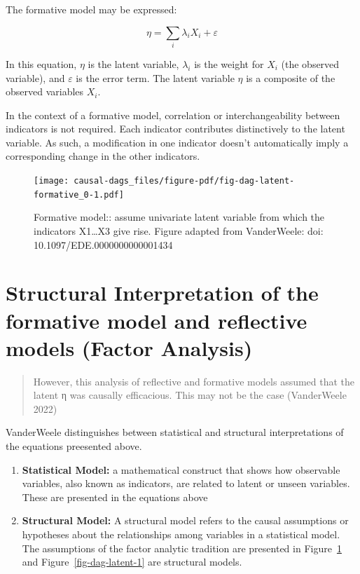 \documentclass[
  singlecolumn]{report}
\begin{document}
The formative model may be expressed:

\[\eta = \sum_i\lambda_i X_i + \varepsilon\]

In this equation, \(\eta\) is the latent variable, \(\lambda_i\) is the
weight for \(X_i\) (the observed variable), and \(\varepsilon\) is the
error term. The latent variable \(\eta\) is a composite of the observed
variables \(X_i\).

In the context of a formative model, correlation or interchangeability
between indicators is not required. Each indicator contributes
distinctively to the latent variable. As such, a modification in one
indicator doesn't automatically imply a corresponding change in the
other indicators.

\begin{figure}

{\centering \texttt{[image: causal-dags\_files/figure-pdf/fig-dag-latent-formative\_0-1.pdf]}

}

\caption{\label{fig-dag-latent-formative_0}Formative model:: assume
univariate latent variable from which the indicators X1\ldots X3 give
rise. Figure adapted from VanderWeele: doi:
10.1097/EDE.0000000000001434}

\end{figure}

\hypertarget{structural-interpretation-of-the-formative-model-and-reflective-models-factor-analysis}{%
\section{Structural Interpretation of the formative model and reflective
models (Factor
Analysis)}\label{structural-interpretation-of-the-formative-model-and-reflective-models-factor-analysis}}

\begin{quote}
However, this analysis of reflective and formative models assumed that
the latent η was causally efficacious. This may not be the case
(VanderWeele 2022)
\end{quote}

VanderWeele distinguishes between statistical and structural
interpretations of the equations preesented above.

\begin{enumerate}
\def\labelenumi{\arabic{enumi}.}
\item
  \textbf{Statistical Model:} a mathematical construct that shows how
  observable variables, also known as indicators, are related to latent
  or unseen variables. These are presented in the equations above
\item
  \textbf{Structural Model:} A structural model refers to the causal
  assumptions or hypotheses about the relationships among variables in a
  statistical model. The assumptions of the factor analytic tradition
  are presented in Figure~\ref{fig-dag-latent-formative_0} and
  Figure~\ref{fig-dag-latent-1} are structural models.
\end{enumerate}
\end{document}
